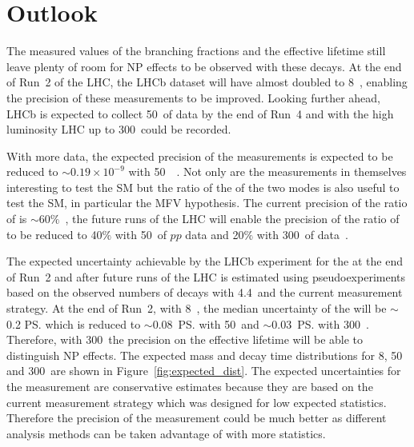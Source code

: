 \section{Outlook}
The measured values of the branching fractions and the effective lifetime still leave plenty of room for NP effects to be observed with these decays. At the end of Run~2 of the LHC, the LHCb dataset will have almost doubled to 8~\fb, enabling the precision of these measurements to be improved. Looking further ahead, LHCb is expected to collect 50~\fb of data by the end of Run~4 and with the high luminosity LHC up to 300~\fb could be recorded. 

With more data, the expected precision of the \BF measurements is expected to be reduced to $\sim 0.19 \times 10^{-9}$ with 50~\fb~\cite{LHCb-PUB-2014-040}. Not only are the \BF measurements in themselves interesting to test the SM but the ratio of the \BFs of the two modes is also useful to test the SM, in particular the MFV hypothesis. The current precision of the ratio of \BFs is $\sim 60\%$~\cite{CMS:2014xfa}, the future runs of the LHC will enable the precision of the ratio of \BFs to be reduced to 40$\%$ with 50~\fb of $pp$ data and 20$\%$ with 300~\fb of data~\cite{Aaij:2244311}. 

The expected uncertainty achievable by the LHCb experiment for the \el at the end of Run~2 and after future runs of the LHC is estimated using pseudoexperiments based on the observed numbers of decays with 4.4~\fb and the current measurement strategy. At the end of Run~2, with 8~\fb, the median uncertainty of the \el will be $\sim$0.2 \ps which is reduced to $\sim$0.08~\ps with 50~\fb and $\sim$0.03~\ps with 300~\fb. Therefore, with 300~\fb the precision on the effective lifetime will be able to distinguish NP effects. The expected mass and decay time distributions for 8, 50 and 300~\fb are shown in Figure~\ref{fig:expected_dist}. The expected uncertainties for the \el measurement are conservative estimates because they are based on the current measurement strategy which was designed for low expected statistics. Therefore the precision of the measurement could be much better as different analysis methods can be taken advantage of with more statistics. 


